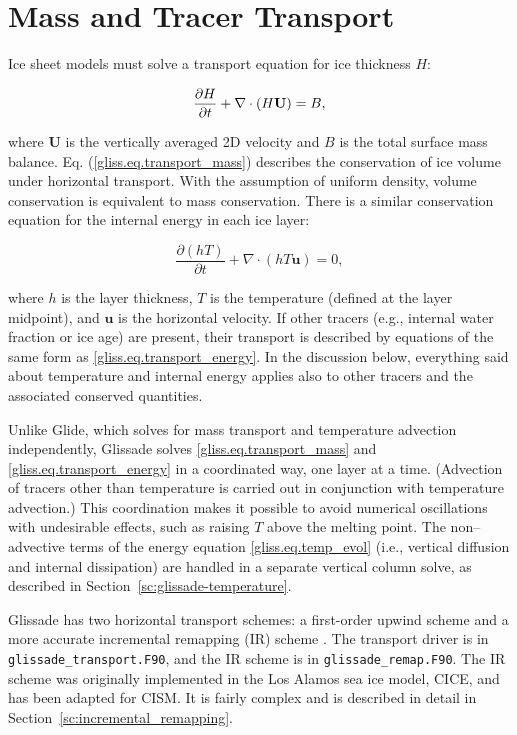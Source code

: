 \section{Mass and Tracer Transport}
\label{sc:glissade-transport}

Ice sheet models must solve a transport equation for ice thickness $H$:

\begin{equation}
  \label{gliss.eq.transport_mass}
  \frac{\partial H}{\partial t} + \nabla \cdot (H {\bf U}) = B,
\end{equation}

\noindent
where $\mathbf{U}$ is the vertically averaged 2D velocity and $B$ is the 
total surface mass balance.
Eq. (\ref{gliss.eq.transport_mass}) describes the conservation of
ice volume under horizontal transport.  
With the assumption of uniform density, volume conservation is equivalent to mass conservation.
There is a similar conservation equation for the internal energy in each ice layer:

\begin{equation}
  \label{gliss.eq.transport_energy}
  \frac{\partial{(h T)}}{\partial t} + \nabla \cdot (h T \mathbf{u}) = 0,
\end{equation}

\noindent
where $h$ is the layer thickness, $T$ is the temperature (defined at the layer midpoint),
and $\mathbf{u}$ is the horizontal velocity.  
If other tracers (e.g., internal water fraction
or ice age) are present, their transport is described by equations of the
same form as \eqref{gliss.eq.transport_energy}.  In the discussion below,
everything said about temperature and internal energy applies also to
other tracers and the associated conserved quantities.

Unlike Glide, which solves for mass transport and temperature advection independently,
Glissade solves \eqref{gliss.eq.transport_mass} and \eqref{gliss.eq.transport_energy}
in a coordinated way, one layer at a time. (Advection of tracers other than temperature
is carried out in conjunction with temperature advection.)
This coordination makes it possible to avoid numerical oscillations
with undesirable effects, such as raising $T$ above the melting point.
The non--advective terms of the energy equation \eqref{gliss.eq.temp_evol}
(i.e., vertical diffusion and internal dissipation) are handled in a separate 
vertical column solve, as described in Section~\ref{sc:glissade-temperature}.

Glissade has two horizontal transport schemes: a first-order
upwind scheme and a more accurate incremental remapping (IR) scheme
\citep{Dukowicz2000, Lipscomb2004}.
The transport driver is in \texttt{glissade\_transport.F90}, and the
IR scheme is in \texttt{glissade\_remap.F90}.
The IR scheme was originally implemented in the Los Alamos sea ice model, CICE,
and has been adapted for CISM. It is fairly complex and is described in
detail in Section~\ref{sc:incremental_remapping}.

